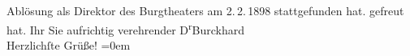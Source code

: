 \begin{ledgroupsized}[t]{13cm}
{{{                  Ablösung als Direktor des Burgtheaters am 2. 2. 1898
                  stattgefunden hat.}}}\label{K_L00773-2h} gefreut hat. Ihr Sie aufrichtig verehrender\pend
           \pstart
           \spacefill\mbox{D\textsuperscript{r}Burckhard}{\\[\baselineskip]}Herzlichſte Grüße!\pend
           \leftskip=0em{}
         
         \endnumbering{}\end{ledgroupsized}  \newcommand{\dateiname}{L00773}\newcommand{\titel}{Max Burckhard an Arthur Schnitzler, 5. 2. 1898}\newcommand{\editorInnen}{Martin Anton Müller und Gerd-Hermann Susen}
      
